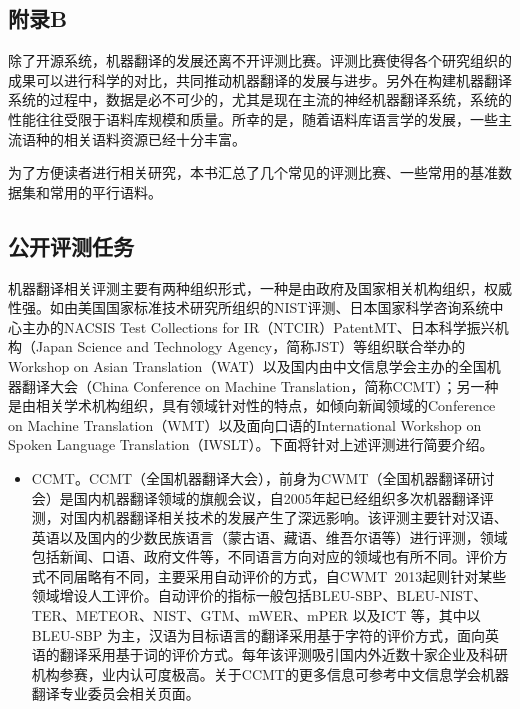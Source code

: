 \begin{appendices}
\chapter{附录B}
\label{appendix-B}
\parinterval 除了开源系统，机器翻译的发展还离不开评测比赛。评测比赛使得各个研究组织的成果可以进行科学的对比，共同推动机器翻译的发展与进步。另外在构建机器翻译系统的过程中，数据是必不可少的，尤其是现在主流的神经机器翻译系统，系统的性能往往受限于语料库规模和质量。所幸的是，随着语料库语言学的发展，一些主流语种的相关语料资源已经十分丰富。

\parinterval 为了方便读者进行相关研究，本书汇总了几个常见的评测比赛、一些常用的基准数据集和常用的平行语料。

\section{公开评测任务}
\parinterval 机器翻译相关评测主要有两种组织形式，一种是由政府及国家相关机构组织，权威性强。如由美国国家标准技术研究所组织的NIST评测、日本国家科学咨询系统中心主办的NACSIS Test Collections for IR（NTCIR）PatentMT、日本科学振兴机构（Japan Science and Technology Agency，简称JST）等组织联合举办的Workshop on Asian Translation（WAT）以及国内由中文信息学会主办的全国机器翻译大会（China Conference on Machine Translation，简称CCMT）；另一种是由相关学术机构组织，具有领域针对性的特点，如倾向新闻领域的Conference on Machine Translation（WMT）以及面向口语的International Workshop on Spoken Language Translation（IWSLT）。下面将针对上述评测进行简要介绍。

\begin{itemize}
\vspace{0.5em}
\item CCMT。CCMT（全国机器翻译大会），前身为CWMT（全国机器翻译研讨会）是国内机器翻译领域的旗舰会议，自2005年起已经组织多次机器翻译评测，对国内机器翻译相关技术的发展产生了深远影响。该评测主要针对汉语、英语以及国内的少数民族语言（蒙古语、藏语、维吾尔语等）进行评测，领域包括新闻、口语、政府文件等，不同语言方向对应的领域也有所不同。评价方式不同届略有不同，主要采用自动评价的方式，自CWMT\ 2013起则针对某些领域增设人工评价。自动评价的指标一般包括BLEU-SBP、BLEU-NIST、TER、METEOR、NIST、GTM、mWER、mPER 以及ICT 等，其中以BLEU-SBP 为主，汉语为目标语言的翻译采用基于字符的评价方式，面向英语的翻译采用基于词的评价方式。每年该评测吸引国内外近数十家企业及科研机构参赛，业内认可度极高。关于CCMT的更多信息可参考中文信息学会机器翻译专业委员会相关页面。


\end{itemize}
\end{appendices}
